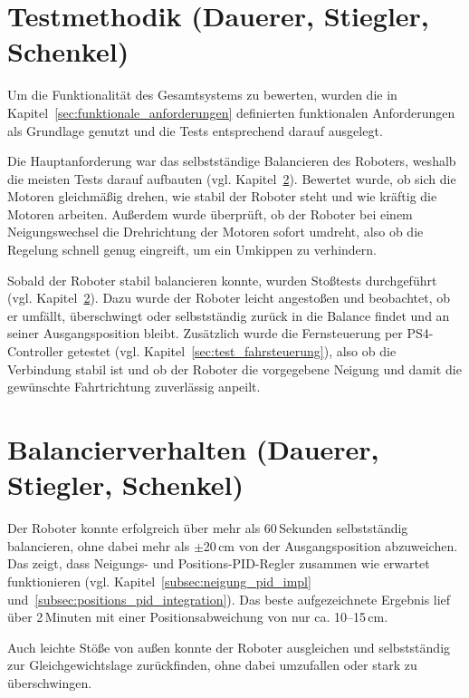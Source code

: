 \documentclass[fontsize=12pt,
parskip=half,	%
department=FakM,  %
logostyle=flat,
twoside, %
DIV=15,BCOR=10mm, %
]{OTHRreprt}
\begin{document}
\section{Testmethodik (Dauerer, Stiegler, Schenkel)}
\label{sec:testmethodik}

Um die Funktionalität des Gesamtsystems zu bewerten, wurden die in Kapitel~\ref{sec:funktionale_anforderungen} definierten funktionalen Anforderungen als Grundlage genutzt und die Tests entsprechend darauf ausgelegt.

Die Hauptanforderung war das selbstständige Balancieren des Roboters, weshalb die meisten Tests darauf aufbauten (vgl. Kapitel~\ref{sec:balancierverhalten}). Bewertet wurde, ob sich die Motoren gleichmäßig drehen, wie stabil der Roboter steht und wie kräftig die Motoren arbeiten. Außerdem wurde überprüft, ob der Roboter bei einem Neigungswechsel die Drehrichtung der Motoren sofort umdreht, also ob die Regelung schnell genug eingreift, um ein Umkippen zu verhindern.

Sobald der Roboter stabil balancieren konnte, wurden Stoßtests durchgeführt (vgl. Kapitel~\ref{sec:balancierverhalten}). Dazu wurde der Roboter leicht angestoßen und beobachtet, ob er umfällt, überschwingt oder selbstständig zurück in die Balance findet und an seiner Ausgangsposition bleibt. Zusätzlich wurde die Fernsteuerung per PS4-Controller getestet (vgl. Kapitel~\ref{sec:test_fahrsteuerung}), also ob die Verbindung stabil ist und ob der Roboter die vorgegebene Neigung und damit die gewünschte Fahrtrichtung zuverlässig anpeilt.

\section{Balancierverhalten (Dauerer, Stiegler, Schenkel)}
\label{sec:balancierverhalten}

Der Roboter konnte erfolgreich über mehr als 60\,Sekunden selbstständig balancieren, ohne dabei mehr als $\pm$20\,cm von der Ausgangsposition abzuweichen. Das zeigt, dass Neigungs- und Positions-PID-Regler zusammen wie erwartet funktionieren (vgl. Kapitel~\ref{subsec:neigung_pid_impl} und~\ref{subsec:positions_pid_integration}). Das beste aufgezeichnete Ergebnis lief über 2\,Minuten mit einer Positionsabweichung von nur ca. 10--15\,cm.

Auch leichte Stöße von außen konnte der Roboter ausgleichen und selbstständig zur Gleichgewichtslage zurückfinden, ohne dabei umzufallen oder stark zu überschwingen.
\end{document}
